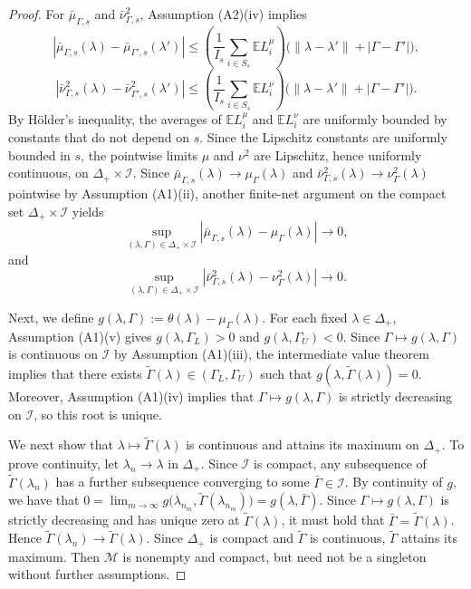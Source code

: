 \documentclass[12pt,leqno,titlepage]{amsart}
\newcommand{\DeltaP}{\Delta_+}
\newcommand{\Mcal}{\mathcal M}
\newcommand{\1}{\mathbbm{1}}
\begin{document}
\begin{bibunit}
{\begin{proof}
For \(\bar\mu_{\Gamma,s}\) and \(\bar\nu_{\Gamma,s}^2\), Assumption \textup{(A2)(iv)} implies
\[
|\bar\mu_{\Gamma,s}(\lambda)-\bar\mu_{\Gamma',s}(\lambda')|
\le
\left(\frac1{I_s}\sum_{i\in S_s}\mathbb EL_i^\mu\right)
\bigl(\|\lambda-\lambda'\|+|\Gamma-\Gamma'|\bigr),
\]
\[
|\bar\nu_{\Gamma,s}^2(\lambda)-\bar\nu_{\Gamma',s}^2(\lambda')|
\le
\left(\frac1{I_s}\sum_{i\in S_s}\mathbb EL_i^\nu\right)
\bigl(\|\lambda-\lambda'\|+|\Gamma-\Gamma'|\bigr).
\]
By Hölder's inequality, the averages of \(\mathbb EL_i^\mu\) and \(\mathbb EL_i^\nu\) are uniformly bounded by constants that do not depend on \(s\). Since the Lipschitz constants are uniformly bounded in \(s\), the pointwise limits \(\mu\) and \(\nu^2\) are Lipschitz, hence uniformly continuous, on \(\Delta_+\times\mathcal I\). Since \(\bar\mu_{\Gamma,s}(\lambda)\to\mu_\Gamma(\lambda)\) and \(\bar\nu_{\Gamma,s}^2(\lambda)\to\nu_\Gamma^2(\lambda)\) pointwise by Assumption \textup{(A1)(ii)}, another finite-net argument on the compact set \(\Delta_+\times\mathcal I\) yields
\[
\sup_{(\lambda,\Gamma)\in\Delta_+\times\mathcal I}
|\bar\mu_{\Gamma,s}(\lambda)-\mu_\Gamma(\lambda)|\to 0,
\]
and
\[
\sup_{(\lambda,\Gamma)\in\Delta_+\times\mathcal I}
|\bar\nu_{\Gamma,s}^2(\lambda)-\nu_\Gamma^2(\lambda)|\to 0.
\]

Next, we define
$
g(\lambda,\Gamma):=\theta(\lambda)-\mu_\Gamma(\lambda).
$
For each fixed \(\lambda\in\Delta_+\), Assumption \textup{(A1)(v)} gives
$
g(\lambda,\Gamma_L)>0$ and $
g(\lambda,\Gamma_U)<0.
$
Since \(\Gamma\mapsto g(\lambda,\Gamma)\) is continuous on \(\mathcal I\) by Assumption \textup{(A1)(iii)}, the intermediate value theorem implies that there exists \(\widetilde\Gamma(\lambda)\in(\Gamma_L,\Gamma_U)\) such that
$
g(\lambda,\widetilde\Gamma(\lambda))=0.
$
Moreover, Assumption \textup{(A1)(iv)} implies that \(\Gamma\mapsto g(\lambda,\Gamma)\) is strictly decreasing on \(\mathcal I\), so this root is unique.

We next show that \(\lambda\mapsto \widetilde\Gamma(\lambda)\) is continuous and attains its maximum on \(\Delta_+\). To prove continuity, let \(\lambda_n\to\lambda\) in \(\Delta_+\). Since \(\mathcal I\) is compact, any subsequence of \(\widetilde\Gamma(\lambda_n)\) has a further subsequence converging to some \(\bar\Gamma\in\mathcal I\). By continuity of \(g\), we have that
$
0
=
\lim_{m\to\infty} g\bigl(\lambda_{n_m},\widetilde\Gamma(\lambda_{n_m})\bigr)
=
g(\lambda,\bar\Gamma).
$
Since \(\Gamma\mapsto g(\lambda,\Gamma)\) is strictly decreasing and has unique zero at \(\widetilde\Gamma(\lambda)\), it must hold that \(\bar\Gamma=\widetilde\Gamma(\lambda)\). Hence \(\widetilde\Gamma(\lambda_n)\to\widetilde\Gamma(\lambda)\). Since \(\DeltaP\) is compact and \(\widetilde\Gamma\) is continuous, \(\widetilde\Gamma\) attains its maximum. 
Then \(\Mcal\) is nonempty and compact, but need not be a singleton without further assumptions.




\end{proof}}
\end{bibunit}
\end{document}
